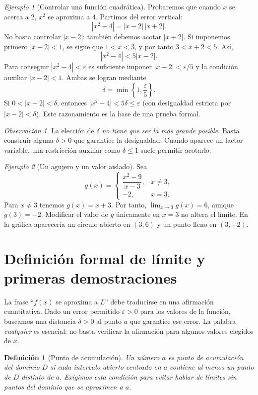 \documentclass[12pt]{article}
\newtheorem{definicion}{Definición}[section]
\theoremstyle{remark}
\newtheorem{observacion}{Observación}
\newtheorem{ejemplo}{Ejemplo}
\begin{document}
\begin{ejemplo}[Controlar una función cuadrática]
Probaremos que cuando $x$ se acerca a $2$, $x^2$ se aproxima a $4$. Partimos del error vertical:
\[
 |x^2-4|=|x-2|\,|x+2|.
\]
No basta controlar $|x-2|$: también debemos acotar $|x+2|$. Si imponemos primero $|x-2|<1$, se sigue que $1<x<3$, y por tanto $3<x+2<5$. Así,
\[
 |x^2-4|<5|x-2|.
\]
Para conseguir $|x^2-4|<\varepsilon$ es suficiente imponer $|x-2|<\varepsilon/5$ y la condición auxiliar $|x-2|<1$. Ambas se logran mediante
\[
 \boxed{\delta=\min\left\{1,\frac{\varepsilon}{5}\right\}.}
\]
Si $0<|x-2|<\delta$, entonces $|x^2-4|<5\delta\le\varepsilon$ (con desigualdad estricta por $|x-2|<\delta$). Este razonamiento es la base de una prueba formal.
\end{ejemplo}

\begin{observacion}
La elección de $\delta$ \emph{no tiene que ser la más grande posible}. Basta construir alguna $\delta>0$ que garantice la desigualdad. Cuando aparece un factor variable, una restricción auxiliar como $\delta\le 1$ suele permitir acotarlo.
\end{observacion}

\begin{ejemplo}[Un agujero y un valor aislado]
Sea
\[
 g(x)=\begin{cases}\dfrac{x^2-9}{x-3},&x\ne3,\\ -2,&x=3.\end{cases}
\]
Para $x\ne3$ tenemos $g(x)=x+3$. Por tanto, $\lim_{x\to3}g(x)=6$, aunque $g(3)=-2$. Modificar el valor de $g$ únicamente en $x=3$ no altera el límite. En la gráfica aparecería un círculo abierto en $(3,6)$ y un punto lleno en $(3,-2)$.
\end{ejemplo}

\section{Definición formal de límite y primeras demostraciones}
La frase ``$f(x)$ se aproxima a $L$'' debe traducirse en una afirmación cuantitativa. Dado un error permitido $\varepsilon>0$ para los valores de la función, buscamos una distancia $\delta>0$ al punto $a$ que garantice ese error. La palabra \emph{cualquier} es esencial: no basta verificar la afirmación para algunos valores elegidos de $x$.

\begin{definicion}[Punto de acumulación]
Un número $a$ es punto de acumulación del dominio $D$ si cada intervalo abierto centrado en $a$ contiene al menos un punto de $D$ distinto de $a$. Exigimos esta condición para evitar hablar de límites sin puntos del dominio que se aproximen a $a$.
\end{definicion}
\end{document}
